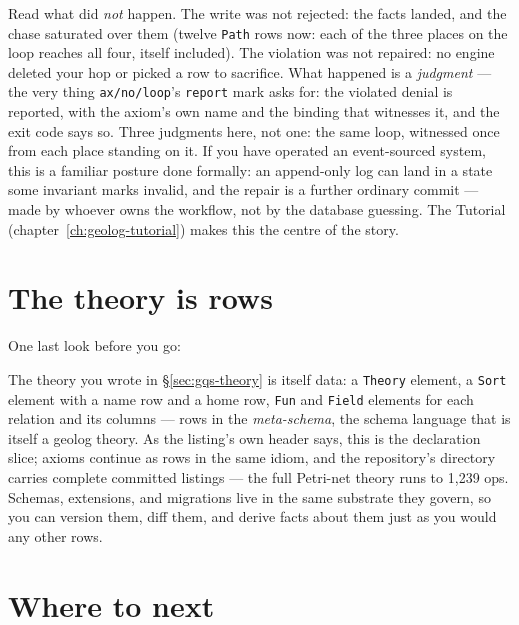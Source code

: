 

Read what did \emph{not} happen. The write was not rejected: the
facts landed, and the chase saturated over them (twelve \texttt{Path}
rows now: each of the three places on the loop reaches all four,
itself included). The
violation was not repaired: no engine deleted your hop or picked a
row to sacrifice. What happened is a \emph{judgment} --- the very
thing \texttt{ax/no/loop}'s \texttt{report} mark asks for: the
violated denial is reported, with the axiom's own name and the
binding that witnesses it, and the exit code says so. Three
judgments here, not one: the same loop, witnessed once from each
place standing on it. If you have
operated an event-sourced system, this is a familiar posture done
formally: an
append-only log can land in a state some invariant marks invalid, and
the repair is a further ordinary commit --- made by whoever owns the
workflow, not by the database guessing. The Tutorial
(chapter~\ref{ch:geolog-tutorial}) makes this the centre of the
story.

\section{The theory is rows}
\label{sec:gqs-rows}

One last look before you go:



The theory you wrote in \S\ref{sec:gqs-theory} is itself data: a
\texttt{Theory} element, a \texttt{Sort} element with a name row and
a home row, \texttt{Fun} and \texttt{Field} elements for each
relation and its columns --- rows in the \emph{meta-schema}, the
schema language that is itself a geolog theory. As the listing's own
header says, this is the declaration slice; axioms continue as rows
in the same idiom, and the repository's 
directory carries complete committed listings --- the full Petri-net
theory runs to 1{,}239 ops.
Schemas, extensions, and migrations live in the same substrate they
govern, so you can version them, diff them, and derive facts about
them just as you would any other rows.

\section{Where to next}
\label{sec:gqs-next}

